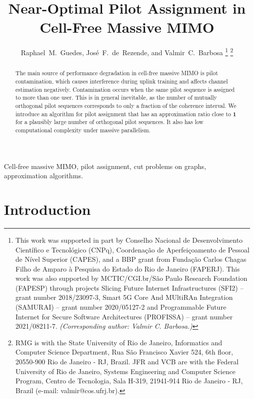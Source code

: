 \documentclass[]{IEEEtran}
\begin{document}
\title{Near-Optimal Pilot Assignment in Cell-Free Massive MIMO}

\author{Raphael~M.~Guedes, José~F.~de~Rezende, and Valmir~C.~Barbosa
\thanks{This work was supported in part by Conselho Nacional de Desenvolvimento
Científico e Tecnológico (CNPq), Coordenação de Aperfeiçoamento de Pessoal de
Nível Superior (CAPES), and a BBP grant from Fundação Carlos Chagas Filho de
Amparo à Pesquisa do Estado do Rio de Janeiro (FAPERJ).
This work was also supported by MCTIC/CGI.br/São Paulo Research Foundation
(FAPESP) through projects Slicing Future Internet Infrastructures (SFI2) – grant
number 2018/23097-3, Smart 5G Core And MUltiRAn Integration (SAMURAI) – grant
number 2020/05127-2 and Programmable Future Internet for Secure Software
Architectures (PROFISSA) – grant number 2021/08211-7.
\textit{(Corresponding author: Valmir C. Barbosa.)}}
\thanks{RMG is with the State University of Rio de Janeiro, Informatics and
Computer Science Department, Rua São Francisco Xavier 524, 6th floor,
20550-900 Rio de Janeiro - RJ, Brazil. JFR and VCB are with the Federal
University of Rio de Janeiro, Systems Engineering and Computer Science Program,
Centro de Tecnologia, Sala H-319, 21941-914 Rio de Janeiro - RJ, Brazil (e-mail:
valmir@cos.ufrj.br).}}

\maketitle

\begin{abstract}
The main source of performance degradation in cell-free massive MIMO is pilot
contamination, which causes interference during uplink training and affects
channel estimation negatively. Contamination occurs when the same pilot
sequence is assigned to more than one user. This is in general inevitable, as
the number of mutually orthogonal pilot sequences corresponds to only a fraction
of the coherence interval. We introduce an algorithm for pilot assignment that
has an approximation ratio close to $\mathbf{1}$ for a plausibly large number of
orthogonal pilot sequences. It also has low computational complexity under
massive parallelism.
\end{abstract}

\begin{IEEEkeywords}
Cell-free massive MIMO,
pilot assignment,
cut problems on graphs,
approximation algorithms.
\end{IEEEkeywords}

\section{Introduction}
\label{intr}
\end{document}
